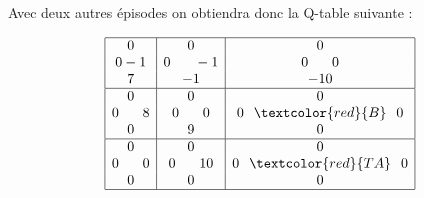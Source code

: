 \documentclass{beamer}
\begin{document}
\begin{frame}
Avec deux autres épisodes on obtiendra donc la Q-table suivante : \pause

\begin{figure}[!ht]
\centering
$$\begin{array}{|c|c|c|}
\hline
0                      & 0                           & 0 \\
0 -1 & 0 \hspace*{0.6cm} -1 & 0\hspace*{0.6cm}0 \\
7          & -1          & -10 \\
\hline
0          & 0                            & 0 \\
0\hspace*{0.6cm}8   & 0\hspace*{0.6cm} 0                  & 0\hspace*{0.25cm}\textcolor{red}{B}\hspace*{0.25cm} 0 \\
0           & 9         & 0 \\
\hline
0          & 0                         & 0\\
0\hspace*{0.6cm} 0                     & 0\hspace*{0.6cm}10                & 0\hspace*{0.25cm}\textcolor{red}{T A}\hspace*{0.25cm} 0 \\
0                            & 0        & 0 \\
\hline
\end{array}
$$
\end{figure}
\end{frame}
\end{document}
